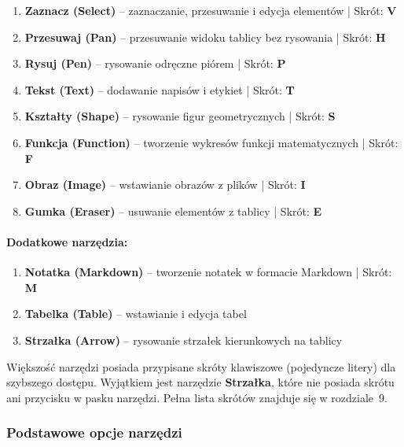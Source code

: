 \documentclass[12pt,a4paper]{article}
\begin{document}
\begin{enumerate}
    \item \textbf{Zaznacz (Select)} -- zaznaczanie, przesuwanie i edycja elementów | Skrót: \textbf{V}
    \item \textbf{Przesuwaj (Pan)} -- przesuwanie widoku tablicy bez rysowania | Skrót: \textbf{H}
    \item \textbf{Rysuj (Pen)} -- rysowanie odręczne piórem | Skrót: \textbf{P}
    \item \textbf{Tekst (Text)} -- dodawanie napisów i etykiet | Skrót: \textbf{T}
    \item \textbf{Kształty (Shape)} -- rysowanie figur geometrycznych | Skrót: \textbf{S}
    \item \textbf{Funkcja (Function)} -- tworzenie wykresów funkcji matematycznych | Skrót: \textbf{F}
    \item \textbf{Obraz (Image)} -- wstawianie obrazów z plików | Skrót: \textbf{I}
    \item \textbf{Gumka (Eraser)} -- usuwanie elementów z tablicy | Skrót: \textbf{E}
\end{enumerate}

\paragraph{Dodatkowe narzędzia:}

\begin{enumerate}
    \item \textbf{Notatka (Markdown)} -- tworzenie notatek w formacie Markdown | Skrót: \textbf{M}
    \item \textbf{Tabelka (Table)} -- wstawianie i edycja tabel
    \item \textbf{Strzałka (Arrow)} -- rysowanie strzałek kierunkowych na tablicy
\end{enumerate}

\begin{tcolorbox}[colback=green!5!white,colframe=green!75!black,title=\faLightbulb\ Pro Tip]
Większość narzędzi posiada przypisane skróty klawiszowe (pojedyncze litery) dla szybszego dostępu. Wyjątkiem jest narzędzie \textbf{Strzałka}, które nie posiada skrótu ani przycisku w pasku narzędzi. Pełna lista skrótów znajduje się w rozdziale~9.
\end{tcolorbox}

\subsubsection{Podstawowe opcje narzędzi}
\end{document}
